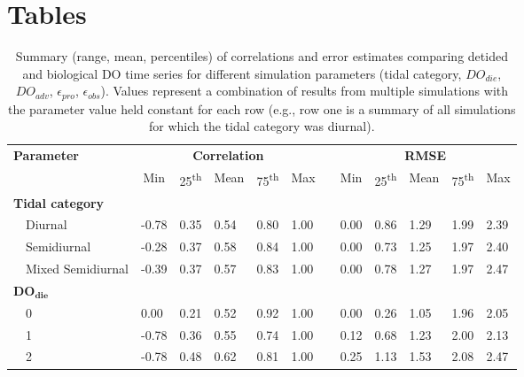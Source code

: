 \documentclass[letterpaper,12pt,oneside]{article}\usepackage[]{graphicx}\usepackage[]{color}
\begin{document}

\section{Tables}

%
\begin{table}[h]
\caption{Summary (range, mean, percentiles) of correlations and error estimates comparing detided and biological \ac{DO} time series for different simulation parameters (tidal category, $DO_{die}$, $DO_{adv}$, $\epsilon_{pro}$, $\epsilon_{obs}$).  Values represent a combination of results from multiple simulations with the parameter value held constant for each row (e.g., row one is a summary of all simulations for which the tidal category was diurnal).\label{tab:dtd_perf1}} 
\begin{center}
\begin{tabular}{llllllclllll}
\hline\hline
\multicolumn{1}{l}{\bfseries Parameter}&\multicolumn{5}{c}{\bfseries Correlation}&\multicolumn{1}{c}{\bfseries }&\multicolumn{5}{c}{\bfseries RMSE}\tabularnewline
\cline{2-6} \cline{8-12}
\multicolumn{1}{l}{}&\multicolumn{1}{c}{Min}&\multicolumn{1}{c}{25\textsuperscript{th}}&\multicolumn{1}{c}{Mean}&\multicolumn{1}{c}{75\textsuperscript{th}}&\multicolumn{1}{c}{Max}&\multicolumn{1}{c}{}&\multicolumn{1}{c}{Min}&\multicolumn{1}{c}{25\textsuperscript{th}}&\multicolumn{1}{c}{Mean}&\multicolumn{1}{c}{75\textsuperscript{th}}&\multicolumn{1}{c}{Max}\tabularnewline
\hline
{\bfseries Tidal category}&&&&&&&&&&&\tabularnewline
~~Diurnal&-0.78&0.35&0.54&0.80&1.00&&0.00&0.86&1.29&1.99&2.39\tabularnewline
~~Semidiurnal&-0.28&0.37&0.58&0.84&1.00&&0.00&0.73&1.25&1.97&2.40\tabularnewline
~~Mixed Semidiurnal&-0.39&0.37&0.57&0.83&1.00&&0.00&0.78&1.27&1.97&2.47\tabularnewline
\hline
{\bfseries $\boldsymbol{DO_{die}}$}&&&&&&&&&&&\tabularnewline
~~0& 0.00&0.21&0.52&0.92&1.00&&0.00&0.26&1.05&1.96&2.05\tabularnewline
~~1&-0.78&0.36&0.55&0.74&1.00&&0.12&0.68&1.23&2.00&2.13\tabularnewline
~~2&-0.78&0.48&0.62&0.81&1.00&&0.25&1.13&1.53&2.08&2.47\tabularnewline

\end{tabular}
\end{center}
\end{table}
\end{document}

